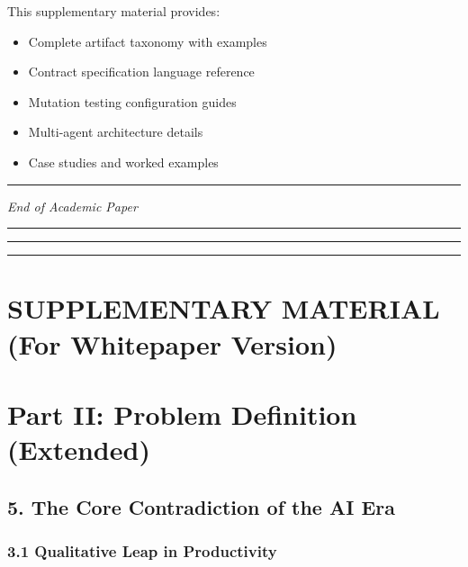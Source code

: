 \documentclass[
]{article}
\begin{document}
This supplementary material provides:

\begin{itemize}
\item
  Complete artifact taxonomy with examples
\item
  Contract specification language reference
\item
  Mutation testing configuration guides
\item
  Multi-agent architecture details
\item
  Case studies and worked examples
\end{itemize}

\begin{center}\rule{0.5\linewidth}{0.5pt}\end{center}

\emph{End of Academic Paper}

\begin{center}\rule{0.5\linewidth}{0.5pt}\end{center}

\begin{center}\rule{0.5\linewidth}{0.5pt}\end{center}

\begin{center}\rule{0.5\linewidth}{0.5pt}\end{center}

\hypertarget{supplementary-material-for-whitepaper-version}{%
\section{SUPPLEMENTARY MATERIAL (For Whitepaper
Version)}\label{supplementary-material-for-whitepaper-version}}

\hypertarget{part-ii-problem-definition-extended}{%
\section{Part II: Problem Definition
(Extended)}\label{part-ii-problem-definition-extended}}

\hypertarget{5-the-core-contradiction-of-the-ai-era}{%
\subsection{5. The Core Contradiction of the AI
Era}\label{5-the-core-contradiction-of-the-ai-era}}

\hypertarget{31-qualitative-leap-in-productivity}{%
\subsubsection{3.1 Qualitative Leap in
Productivity}\label{31-qualitative-leap-in-productivity}}
\end{document}
